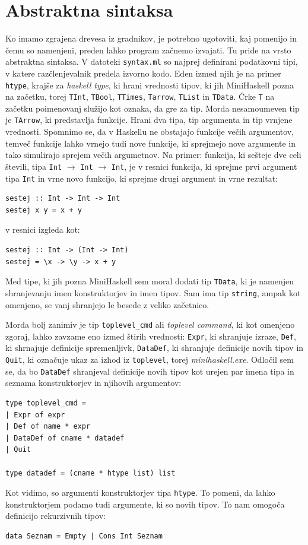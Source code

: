 \documentclass[a4paper,12pt,openright]{book}
\begin{document}
\section{Abstraktna sintaksa}
Ko imamo zgrajena drevesa iz gradnikov, je potrebno ugotoviti, kaj pomenijo in čemu so namenjeni, preden lahko program začnemo izvajati. Tu pride na vrsto abstraktna sintaksa. 
V datoteki \lstinline{syntax.ml} so najprej definirani podatkovni tipi, v katere razčlenjevalnik predela izvorno kodo. Eden izmed njih je na primer 
\lstinline{htype}, krajše za \textit{haskell type}, ki hrani vrednosti tipov, ki jih MiniHaskell pozna na začetku, torej \lstinline{TInt}, \lstinline{TBool}, \lstinline{TTimes}, \lstinline{Tarrow}, \lstinline{TList} in 
\lstinline{TData}. Črke \lstinline{T} na začetku poimenovanj služijo kot oznaka, da gre za tip. Morda nesamoumeven tip je \lstinline{TArrow}, ki predstavlja funkcije. Hrani dva tipa, tip argumenta
in tip vrnjene vrednosti. Spomnimo se, da v Haskellu ne obstajajo funkcije večih argumentov, temveč funkcije lahko vrnejo tudi nove funkcije, ki sprejmejo nove argumente in tako 
simulirajo sprejem večih argumetnov. Na primer: funkcija, ki sešteje dve celi števili, tipa \lstinline{Int} $\rightarrow$ \lstinline{Int} $\rightarrow$ \lstinline{Int}, je v resnici funkcija, ki sprejme prvi argument tipa \lstinline{Int}
in vrne novo funkcijo, ki sprejme drugi argument in vrne rezultat:
\begin{lstlisting}
sestej :: Int -> Int -> Int
sestej x y = x + y
\end{lstlisting}
v resnici izgleda kot:
\begin{lstlisting}
sestej :: Int -> (Int -> Int)
sestej = \x -> \y -> x + y
\end{lstlisting}
Med tipe, ki jih pozna MiniHaskell sem moral dodati tip \lstinline{TData}, ki je namenjen shranjevanju imen konstruktorjev in imen tipov. Sam ima tip \lstinline{string}, ampak kot omenjeno, 
se vanj shranjejo le besede z veliko začetnico. 

Morda bolj zanimiv je tip \lstinline{toplevel_cmd} ali \textit{toplevel command}, ki kot omenjeno zgoraj, lahko zavzame eno izmed štirih vrednosti: \lstinline{Expr}, ki shranjuje izraze, 
\lstinline{Def}, ki shrnajuje definicije spremenljivk, \lstinline{DataDef}, ki shranjuje definicije novih tipov in \lstinline{Quit}, ki označuje ukaz za izhod iz \lstinline{toplevel}, torej 
\emph{minihaskell.exe}. Odločil sem se, da bo \lstinline{DataDef} shranjeval definicije novih tipov kot urejen par imena tipa in seznama konstruktorjev in njihovih argumentov:
\begin{lstlisting}
type toplevel_cmd =
| Expr of expr
| Def of name * expr
| DataDef of cname * datadef
| Quit

type datadef = (cname * htype list) list
\end{lstlisting}
Kot vidimo, so argumenti konstruktorjev tipa \lstinline{htype}. To pomeni, da lahko konstruktorjem podamo tudi argumente, ki so novih tipov. To nam omogoča definicijo rekurzivnih tipov:
\begin{lstlisting}
data Seznam = Empty | Cons Int Seznam
\end{lstlisting}
\end{document}
